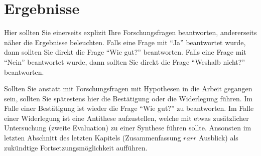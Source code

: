 \chapter{Ergebnisse}\label{chap:Results}
Hier sollten Sie einerseits explizit Ihre Forschungsfragen beantworten, andererseits näher die Ergebnisse beleuchten. Falls eine Frage mit \enquote{Ja} beantwortet wurde, dann sollten Sie direkt die Frage \enquote{Wie gut?} beantworten. Falls eine Frage mit \enquote{Nein} beantwortet wurde, dann sollten Sie direkt die Frage \enquote{Weshalb nicht?} beantworten.

Sollten Sie anstatt mit Forschungsfragen mit Hypothesen in die Arbeit gegangen sein, sollten Sie spätestens hier die Bestätigung oder die Widerlegung führen. Im Falle einer Bestätigung ist wieder die Frage \enquote{Wie gut?} zu beantworten. Im Falle einer Widerlegung ist eine Antithese aufzustellen, welche mit etwas zusätzlicher Untersuchung (zweite Evaluation) zu einer Synthese führen sollte. Ansonsten im letzten Abschnitt des letzten Kapitels (Zusammenfassung $rarr$ Ausblick) als zukündtige Fortsetzungsmöglichkeit aufführen.